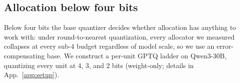 



\subsection{Allocation below four bits}\label{sec:allocsub4}

Below four bits the base quantizer decides whether allocation has anything to work with: under
round-to-nearest quantization, every allocator we measured collapses at every sub-4 budget regardless of model
scale, so we use an error-compensating base. We construct a
per-unit GPTQ \citep{frantar2022gptq} ladder on Qwen3-30B, quantizing every unit at 4, 3, and 2 bits
(weight-only; details in App.~\ref{app:setup}). 


